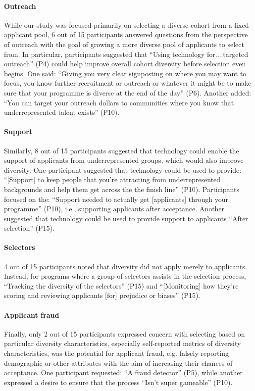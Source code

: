 \paragraph{Outreach}
While our study was focused primarily on selecting a diverse cohort from a fixed applicant pool, 6 out of 15 participants answered questions from the perspective of outreach with the goal of growing a more diverse pool of applicants to select from. In particular, participants suggested that ``Using technology for....targeted outreach'' (P4) could help improve overall cohort diversity before selection even begins. One said: ``Giving you very clear signposting on where you may want to focus, you know further recruitment or outreach or whatever it might be to make sure that your programme is diverse at the end of the day'' (P6). Another added: ``You can target your outreach dollars to communities where you know that underrepresented talent exists'' (P10).

\paragraph{Support}
Similarly, 8 out of 15 participants suggested that technology could enable the support of applicants from underrepresented groups, which would also improve diversity. One participant suggested that technology could be used to provide: ``[Support] to keep people that you're attracting from underrepresented backgrounds and help them get across the the finish line'' (P10). Participants focused on the: ``Support needed to actually get [applicants] through your programme'' (P10), i.e., supporting applicants after acceptance. Another suggested that technology could be used to provide support to applicants ``After selection'' (P15).

\paragraph{Selectors}
4 out of 15 participants noted that diversity did not apply merely to applicants. Instead, for programs where a group of selectors assists in the selection process, ``Tracking the diversity of the selectors'' (P15) and ``[Monitoring] how they're scoring and reviewing applicants [for] prejudice or biases'' (P15).

\paragraph{Applicant fraud}
Finally, only 2 out of 15 participants expressed concern with selecting based on particular diversity characteristics, especially self-reported metrics of diversity characteristics, was the potential for applicant fraud, e.g. falsely reporting demographic or other attributes with the aim of increasing their chances of acceptance. One participant requested: ``A fraud detector'' (P5), while another expressed a desire to ensure that the process ``Isn't super gameable'' (P10).

